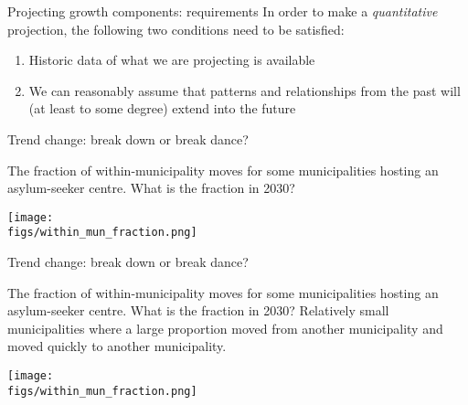 \documentclass[final, 12pt, aspectratio=169, xcolor={dvipsnames}]{beamer}
\newcommand*{\figs}{../figs}%
\newcommand{\semitransp}[2][35]{\color{fg!#1}#2}
\begin{document}
\begin{frame}{Projecting growth components: requirements}
  In order to make a \textit{quantitative} projection, the following two conditions need to be satisfied: 
  \begin{enumerate}
  \item Historic data of what we are projecting is available
    \item We can reasonably assume that patterns and relationships from the past will (at least to some degree) extend into the future
    \end{enumerate}
\end{frame}

\begin{frame}{Trend change: break down or break dance?}
  \begin{minipage}[t]{0.48\linewidth}%
    The fraction of within-municipality moves for some municipalities hosting an asylum-seeker centre. What is the fraction in 2030?
\end{minipage}%
\hfill%
\begin{minipage}[t]{0.48\linewidth}
  \vspace{-1cm}
  \centering
  \texttt{[image: \\figs/within\_mun\_fraction.png]}    
\end{minipage}    
\end{frame}

\begin{frame}{Trend change: break down or break dance?}
  \begin{minipage}[t]{0.48\linewidth}%
    {\semitransp{The fraction of within-municipality moves for some municipalities hosting an asylum-seeker centre. What is the fraction in 2030?}} Relatively small municipalities where a large proportion moved from another municipality and moved quickly to another municipality.
\end{minipage}%
\hfill%
\begin{minipage}[t]{0.48\linewidth}
  \vspace{-1cm}
  \centering
  \texttt{[image: \\figs/within\_mun\_fraction.png]}
\end{minipage}    
\end{frame}
\end{document}
